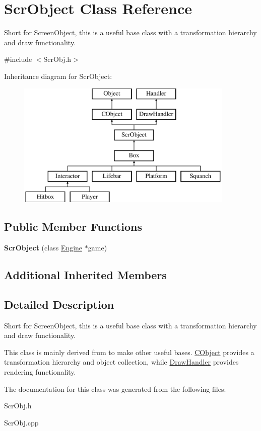 \hypertarget{class_scr_object}{}\section{Scr\+Object Class Reference}
\label{class_scr_object}


Short for Screen\+Object, this is a useful base class with a transformation hierarchy and draw functionality.  




{\ttfamily \#include $<$Scr\+Obj.\+h$>$}

Inheritance diagram for Scr\+Object\+:\begin{figure}[H]
\begin{center}
\leavevmode
\includegraphics[height=6.000000cm]{class_scr_object}
\end{center}
\end{figure}
\subsection*{Public Member Functions}
\begin{DoxyCompactItemize}
\item 
\hypertarget{class_scr_object_a18bb8e44e47711db6e13482d810ad83d}{}\label{class_scr_object_a18bb8e44e47711db6e13482d810ad83d} 
{\bfseries Scr\+Object} (class \hyperlink{class_engine}{Engine} $\ast$game)
\end{DoxyCompactItemize}
\subsection*{Additional Inherited Members}


\subsection{Detailed Description}
Short for Screen\+Object, this is a useful base class with a transformation hierarchy and draw functionality. 

This class is mainly derived from to make other useful bases. \hyperlink{class_c_object}{C\+Object} provides a transformation hierarchy and object collection, while \hyperlink{class_draw_handler}{Draw\+Handler} provides rendering functionality. 

The documentation for this class was generated from the following files\+:\begin{DoxyCompactItemize}
\item 
Scr\+Obj.\+h\item 
Scr\+Obj.\+cpp\end{DoxyCompactItemize}
